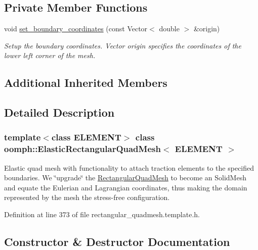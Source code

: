 \subsection*{Private Member Functions}
\begin{DoxyCompactItemize}
\item 
void \hyperlink{classoomph_1_1ElasticRectangularQuadMesh_a84db22a37c49bf3958e149d67997bead}{set\+\_\+boundary\+\_\+coordinates} (const Vector$<$ double $>$ \&origin)
\begin{DoxyCompactList}\small\item\em Setup the boundary coordinates. Vector origin specifies the coordinates of the lower left corner of the mesh. \end{DoxyCompactList}\end{DoxyCompactItemize}
\subsection*{Additional Inherited Members}


\subsection{Detailed Description}
\subsubsection*{template$<$class E\+L\+E\+M\+E\+NT$>$\newline
class oomph\+::\+Elastic\+Rectangular\+Quad\+Mesh$<$ E\+L\+E\+M\+E\+N\+T $>$}

Elastic quad mesh with functionality to attach traction elements to the specified boundaries. We \char`\"{}upgrade\char`\"{} the \hyperlink{classoomph_1_1RectangularQuadMesh}{Rectangular\+Quad\+Mesh} to become an Solid\+Mesh and equate the Eulerian and Lagrangian coordinates, thus making the domain represented by the mesh the stress-\/free configuration. 

Definition at line 373 of file rectangular\+\_\+quadmesh.\+template.\+h.



\subsection{Constructor \& Destructor Documentation}
\mbox{\label{classoomph_1_1ElasticRectangularQuadMesh_aad1e395c3f314854b68c4f1df9256230}} 
